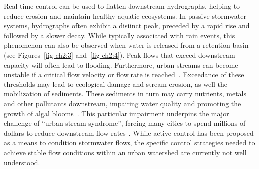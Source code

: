 Real-time control can be used to flatten downstream hydrographs, helping to reduce erosion and maintain healthy aquatic ecosystems. In passive stormwater systems, hydrographs often exhibit a distinct peak, preceded by a rapid rise and followed by a slower decay. While typically associated with rain events, this phenomenon can also be observed when water is released from a retention basin (see Figures~\ref{fig-ch2:3} and~\ref{fig-ch2:4}). Peak flows that exceed downstream capacity will often lead to flooding. Furthermore, urban streams can become unstable if a critical flow velocity or flow rate is reached~\citep{bledsoe2002stream}. Exceedance of these thresholds may lead to ecological damage and stream erosion, as well the mobilization of sediments. These sediments in turn may carry nutrients, metals and other pollutants downstream, impairing water quality and promoting the growth of algal blooms~\cite{Michalak2013Record-settingConditions}. This particular impairment underpins the major challenge of ``urban stream syndrome'', forcing many cities to spend millions of dollars to reduce downstream flow rates~\cite{schilling2008greening, wise2008green}. 
While active control has been proposed as a means to condition stormwater flows, the specific control strategies needed to achieve stable flow conditions within an urban watershed are currently not well understood.

\


